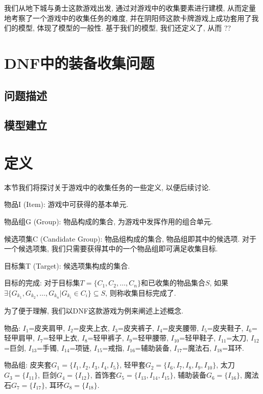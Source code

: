 \documentclass[10pt,journal,compsoc]{IEEEtran}
\begin{document}
  我们从地下城与勇士这款游戏出发, 通过对游戏中的收集要素进行建模, 从而定量地考察了一个游戏中的收集任务的难度, 并在阴阳师这款卡牌游戏上成功套用了我们的模型, 体现了模型的一般性. 基于我们的模型, 我们还定义了, 从而 ??

\section{DNF中的装备收集问题}

\subsection{问题描述}

\subsection{模型建立}



\section{定义}

本节我们将探讨关于游戏中的收集任务的一些定义, 以便后续讨论. 

物品I (Item): 游戏中可获得的基本单元.

物品组G (Group): 物品构成的集合, 为游戏中发挥作用的组合单元.

候选项集C (Candidate Group): 物品组构成的集合, 物品组即其中的候选项. 对于一个候选项集, 我们只需要获得其中的一个物品组即可满足收集目标. 

目标集T (Target): 候选项集构成的集合.

目标的完成: 
对于目标集$T = \{C_1, C_2, \dots, C_n\}$和已收集的物品集合$S$, 如果$\exists \{G_{k_1}, G_{k_2}, \dots, G_{k_n} | G_{k_i} \in C_i\} \subseteq S$, 则称收集目标完成了.


为了便于理解, 我们以DNF这款游戏为例来阐述上述概念.

物品: $I_1$=皮夹肩甲, $I_2$=皮夹上衣, $I_3$=皮夹裤子, $I_4$=皮夹腰带, $I_5$=皮夹鞋子, $I_6$=轻甲肩甲, $I_7$=轻甲上衣, $I_8$=轻甲裤子, $I_9$=轻甲腰带, $I_{10}$=轻甲鞋子, $I_{11}$=太刀, $I_{12}$=巨剑, $I_{13}$=手镯, $I_{14}$=项链, $I_{15}$=戒指, $I_{16}$=辅助装备, $I_{17}$=魔法石, $I_{18}$=耳环. 

物品组: 皮夹套$G_1=\{I_1, I_2, I_3, I_4, I_5\}$, 轻甲套$G_2=\{I_6, I_7, I_8, I_9, I_{10}\}$, 太刀$G_3=\{I_{11}\}$, 巨剑$G_4=\{I_{12}\}$, 首饰套$G_5=\{I_{13}, I_{14}, I_{15}\}$, 辅助装备$G_6=\{I_{16}\}$, 魔法石$G_7=\{I_{17}\}$, 耳环$G_8=\{I_{18}\}$.
\end{document}
